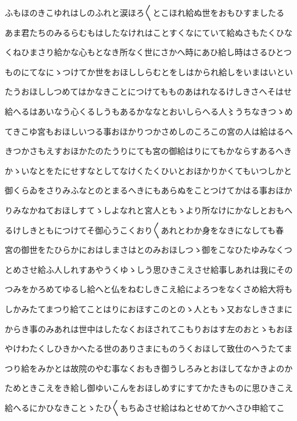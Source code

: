 \documentclass[a4paper,11pt,landscape]{ltjtarticle}
\begin{document}
\par\medskip
ふもほのきこゆれはしのふれと涙ほろ〱とこほれ給ぬ世をおもひすましたる
\par\medskip
あま君たちのみるらむもはしたなけれはことすくなにていて給ぬさもたくひな
\par\medskip
くねひまさり給かな心もとなき所なく世にさかへ時にあひ給し時はさるひとつ
\par\medskip
ものにてなにゝつけてか世をおほししらむとをしはかられ給しをいまはいとい
\par\medskip
たうおほししつめてはかなきことにつけてもものあはれなるけしきさへそはせ
\par\medskip
給へるはあいなう心くるしうもあるかななとおいしらへる人〻うちなきつゝめ
\par\medskip
てきこゆ宮もおほしいつる事おほかりつかさめしのころこの宮の人は給はるへ
\par\medskip
きつかさもえすおほかたのたうりにても宮の御給はりにてもかならすあるへき
\par\medskip
かゝいなとをたにせすなとしてなけくたくひいとおほかりかくてもいつしかと
\par\medskip
御くらゐをさりみふなとのとまるへきにもあらぬをことつけてかはる事おほか
\par\medskip
りみなかねておほしすてゝしよなれと宮人ともゝより所なけにかなしとおもへ
\par\medskip
るけしきともにつけてそ御心うこくおり〱あれとわか身をなきになしても春
\par\medskip
宮の御世をたひらかにおはしまさはとのみおほしつゝ御をこなひたゆみなくつ
\par\medskip
とめさせ給ふ人しれすあやうくゆゝしう思ひきこえさせ給事しあれは我にその
\par\medskip
つみをかろめてゆるし給へと仏をねむしきこえ給によろつをなくさめ給大将も
\par\medskip
しかみたてまつり給てことはりにおほすこのとのゝ人ともゝ又おなしきさまに
\par\medskip
からき事のみあれは世中はしたなくおほされてこもりおはす左のおとゝもおほ
\par\medskip
やけわたくしひきかへたる世のありさまにものうくおほして致仕のへうたてま
\par\medskip
つり給をみかとは故院のやむ事なくおもき御うしろみとおほしてなかきよのか
\par\medskip
ためときこえをき給し御ゆいこんをおほしめすにすてかたきものに思ひきこえ
\par\medskip
給へるにかひなきことゝたひ〱もちゐさせ給はねとせめてかへさひ申給てこ
\par\medskip
\end{document}
